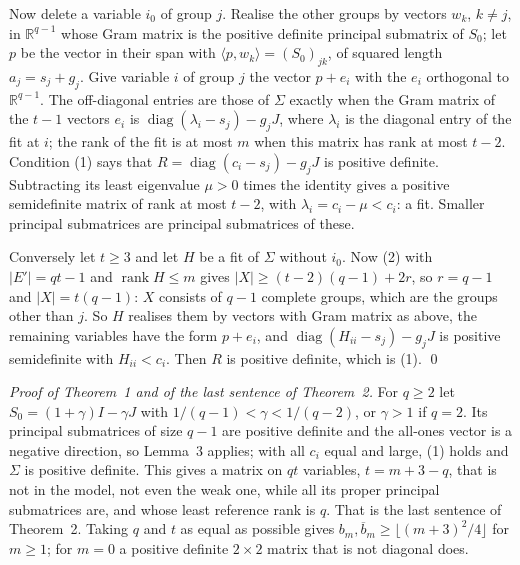 \documentclass[11pt,letterpaper,reqno]{amsart}
\theoremstyle{spaced}
\begin{document}
Now delete a variable \(i_0\) of group \(j\). Realise the other groups by vectors \(w_k\), \(k \ne j\), in \(\mathbb{R}^{q-1}\) whose Gram matrix is the positive definite principal submatrix of \(S_0\); let \(p\) be the vector in their span with \(\langle p, w_k\rangle = (S_0)_{jk}\), of squared length \(a_j = s_j + g_j\). Give variable \(i\) of group \(j\) the vector \(p + e_i\) with the \(e_i\) orthogonal to \(\mathbb{R}^{q-1}\). The off-diagonal entries are those of \(\Sigma\) exactly when the Gram matrix of the \(t-1\) vectors \(e_i\) is \(\operatorname{diag}(\lambda_i - s_j) - g_j J\), where \(\lambda_i\) is the diagonal entry of the fit at \(i\); the rank of the fit is at most \(m\) when this matrix has rank at most \(t-2\). Condition (1) says that \(R = \operatorname{diag}(c_i - s_j) - g_j J\) is positive definite. Subtracting its least eigenvalue \(\mu > 0\) times the identity gives a positive semidefinite matrix of rank at most \(t-2\), with \(\lambda_i = c_i - \mu < c_i\): a fit. Smaller principal submatrices are principal submatrices of these.

Conversely let \(t \ge 3\) and let \(H\) be a fit of \(\Sigma\) without \(i_0\). Now (2) with \(\lvert E'\rvert = qt - 1\) and \(\operatorname{rank} H \le m\) gives \(\lvert X\rvert \ge (t-2)(q-1) + 2r\), so \(r = q-1\) and \(\lvert X\rvert = t(q-1)\): \(X\) consists of \(q-1\) complete groups, which are the groups other than \(j\). So \(H\) realises them by vectors with Gram matrix as above, the remaining variables have the form \(p + e_i\), and \(\operatorname{diag}(H_{ii} - s_j) - g_j J\) is positive semidefinite with \(H_{ii} < c_i\). Then \(R\) is positive definite, which is (1). \qed

\emph{Proof of Theorem~1 and of the last sentence of Theorem~2.} For \(q \ge 2\) let \(S_0 = (1+\gamma)I - \gamma J\) with \(1/(q-1) < \gamma < 1/(q-2)\), or \(\gamma > 1\) if \(q = 2\). Its principal submatrices of size \(q-1\) are positive definite and the all-ones vector is a negative direction, so Lemma~3 applies; with all \(c_i\) equal and large, (1) holds and \(\Sigma\) is positive definite. This gives a matrix on \(qt\) variables, \(t = m+3-q\), that is not in the model, not even the weak one, while all its proper principal submatrices are, and whose least reference rank is \(q\). That is the last sentence of Theorem~2. Taking \(q\) and \(t\) as equal as possible gives \(b_m, \overline{b}_m \ge \lfloor (m+3)^2/4 \rfloor\) for \(m \ge 1\); for \(m = 0\) a positive definite \(2 \times 2\) matrix that is not diagonal does.
\end{document}

